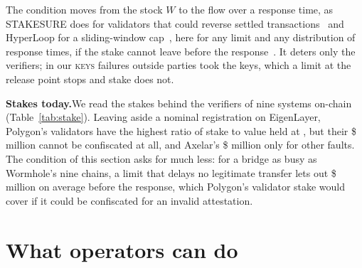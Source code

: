 \documentclass[conference,compsoc]{IEEEtran}
\numberwithin{equation}{section}
\theoremstyle{plain}
\theoremstyle{definition}
\theoremstyle{remark}
\newcommand{\runin}[1]{\par\smallskip\noindent\textbf{#1.}\enspace}
\newcommand{\ckeys}{\textsc{keys}}
\begin{document}
The condition moves from the stock $W$ to the flow over a response time, as STAKESURE does for validators that could reverse settled transactions~\cite{deb2024stakesure} and HyperLoop for a sliding-window cap~\cite{kate2025hyperloop}, here for any limit and any distribution of response times, if the stake cannot leave before the response~\cite{neuder2024exit}. It deters only the verifiers; in our \ckeys{} failures outside parties took the keys, which a limit at the release point stops and stake does not.

\runin{Stakes today}We read the stakes behind the verifiers of nine systems on-chain (Table~\ref{tab:stake}). Leaving aside a nominal registration on EigenLayer, Polygon's validators have the highest ratio of stake to value held at \stakeMaxRatio{}, but their \$\stakePolygonM{} million cannot be confiscated at all, and Axelar's \$\stakeAxelarM{} million only for other faults. The condition of this section asks for much less: for a bridge as busy as Wormhole's nine chains, a limit that delays no legitimate transfer lets out \$\stakeFlowMeanM{} million on average before the response, which Polygon's validator stake would cover if it could be confiscated for an invalid attestation.

\section{What operators can do}\label{sec:advice}
\end{document}
